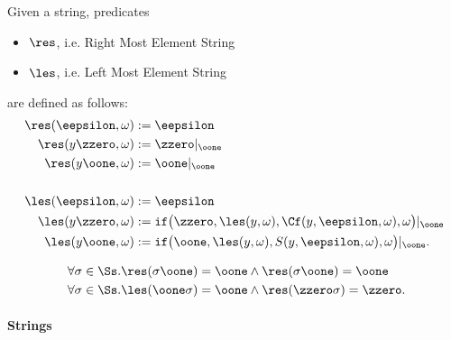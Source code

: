 \begin{conditional}{\notappendix}
  \begin{defn}
  Given a string, predicates
  \begin{itemize}
    \item $\res$, i.e. Right Most Element String
    \item $\les$, i.e. Left Most Element String
  \end{itemize}
  are defined as follows:
  \begin{align*}
  \res(\eepsilon,\omega) &:= \eepsilon \\
  \res(y\zzero, \omega) &:= \zzero|_\oone \\
  \res(y\oone,\omega) &:= \oone|_\oone \\
  \\
  \les(\eepsilon,\omega) &:= \eepsilon \\
  \les(y\zzero,\omega) &:= \mathtt{if}\big(\zzero, \les(y,\omega),
  {\Cf}(y,\eepsilon,\omega),\omega\big)|_{\oone} \\
  \les(y\oone,\omega) &:= \mathtt{if}\big(\oone,
  \les(y,\omega), S(y,\eepsilon,\omega),\omega\big)|_{\oone}.
  \end{align*}
  \end{defn}

  \begin{remark}
  \begin{align*}\
  \forall \sigma \in {\Ss}.\res(\sigma \oone) &=
  \oone \wedge \res(\sigma\oone)=\oone \\
  \forall \sigma \in {\Ss}.\les(\oone\sigma) &=
  \oone \wedge \res(\zzero\sigma)=\zzero.
  \end{align*}
  \end{remark}

  \paragraph{Strings}
  \label{par:strings}


\end{conditional}
